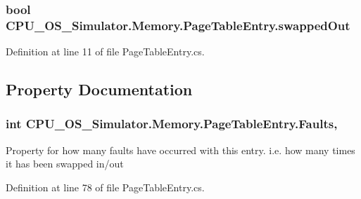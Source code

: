 \subsubsection[{swapped\+Out}]{\setlength{\rightskip}{0pt plus 5cm}bool C\+P\+U\+\_\+\+O\+S\+\_\+\+Simulator.\+Memory.\+Page\+Table\+Entry.\+swapped\+Out\hspace{0.3cm}{\ttfamily [private]}}\label{class_c_p_u___o_s___simulator_1_1_memory_1_1_page_table_entry_ab31d6265aff999ff7a94481f1efc45b5}


Definition at line 11 of file Page\+Table\+Entry.\+cs.



\subsection{Property Documentation}
\hypertarget{class_c_p_u___o_s___simulator_1_1_memory_1_1_page_table_entry_a2a8e194e6452298fe5b0a0c6405bf57b}{}
\subsubsection[{Faults}]{\setlength{\rightskip}{0pt plus 5cm}int C\+P\+U\+\_\+\+O\+S\+\_\+\+Simulator.\+Memory.\+Page\+Table\+Entry.\+Faults\hspace{0.3cm}{\ttfamily [get]}, {\ttfamily [set]}}\label{class_c_p_u___o_s___simulator_1_1_memory_1_1_page_table_entry_a2a8e194e6452298fe5b0a0c6405bf57b}


Property for how many faults have occurred with this entry. i.\+e. how many times it has been swapped in/out 



Definition at line 78 of file Page\+Table\+Entry.\+cs.

\hypertarget{class_c_p_u___o_s___simulator_1_1_memory_1_1_page_table_entry_a4c1fb37bb101546867d77a4f781ba51d}{}
